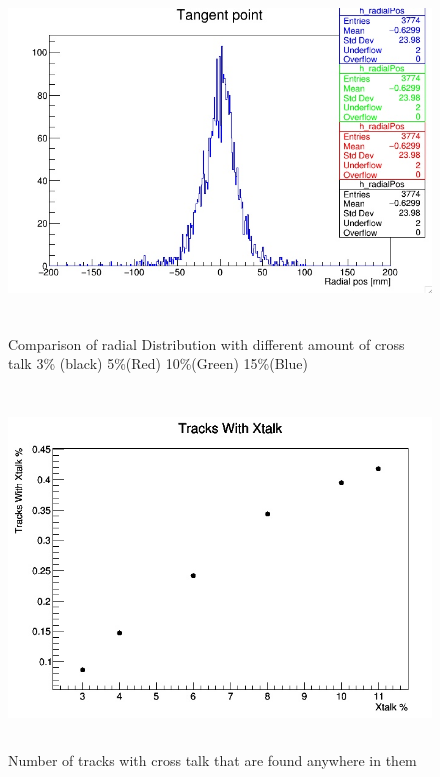 \documentclass[./Thesis]{subfiles}
\begin{document}
\begin{figure}
	\centerline{\includegraphics[height=95mm]{XtalkRadialComp.jpeg}}
	\caption[ Comparison of the Radial Distribution]{ Comparison of radial Distribution with different amount of cross talk 3\% (black) 5\%(Red) 10\%(Green) 15\%(Blue)}
	\label{fig:XtalkRadialComp}
\end{figure}


\begin{figure}
	\centerline{\includegraphics[height=95mm]{TracksXtalk.jpeg}}
	\caption[Tracks with Xtalk]{ Number of tracks with cross talk that are found anywhere in them}
	\label{fig:tracksXtalk}
\end{figure}
\end{document}
